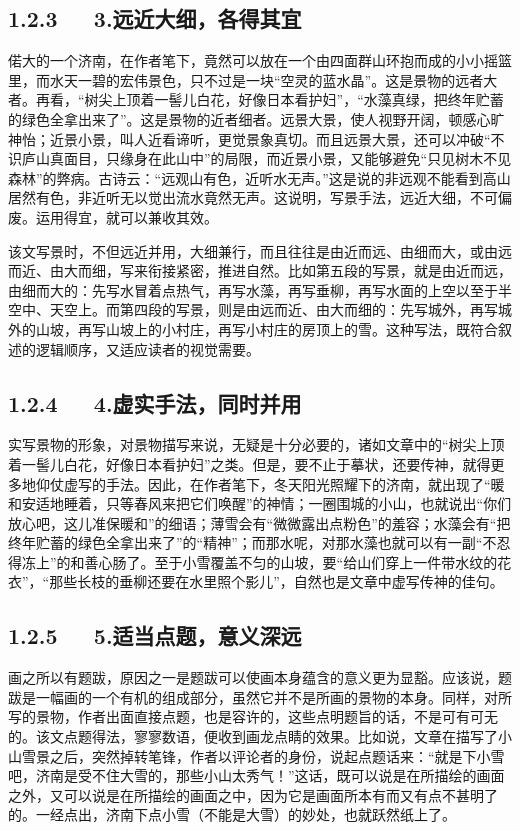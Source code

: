 \documentclass[letterpaper,10pt,english]{sphinxmanual}
\begin{document}
\subsection{1.2.3   3.远近大细，各得其宜}
\label{\detokenize{p01_u6563_u6587/_u8001_u820d-_u6d4e_u5357_u7684_u51ac_u5929:id7}}
偌大的一个济南，在作者笔下，竟然可以放在一个由四面群山环抱而成的小小摇篮里，而水天一碧的宏伟景色，只不过是一块“空灵的蓝水晶”。这是景物的远者大者。再看，“树尖上顶着一髻儿白花，好像日本看护妇”，“水藻真绿，把终年贮蓄的绿色全拿出来了”。这是景物的近者细者。远景大景，使人视野开阔，顿感心旷神怡；近景小景，叫人近看谛听，更觉景象真切。而且远景大景，还可以冲破“不识庐山真面目，只缘身在此山中”的局限，而近景小景，又能够避免“只见树木不见森林”的弊病。古诗云：“远观山有色，近听水无声。”这是说的非远观不能看到高山居然有色，非近听无以觉出流水竟然无声。这说明，写景手法，远近大细，不可偏废。运用得宜，就可以兼收其效。

该文写景时，不但远近并用，大细兼行，而且往往是由近而远、由细而大，或由远而近、由大而细，写来衔接紧密，推进自然。比如第五段的写景，就是由近而远，由细而大的：先写水冒着点热气，再写水藻，再写垂柳，再写水面的上空以至于半空中、天空上。而第四段的写景，则是由远而近、由大而细的：先写城外，再写城外的山坡，再写山坡上的小村庄，再写小村庄的房顶上的雪。这种写法，既符合叙述的逻辑顺序，又适应读者的视觉需要。


\subsection{1.2.4   4.虚实手法，同时并用}
\label{\detokenize{p01_u6563_u6587/_u8001_u820d-_u6d4e_u5357_u7684_u51ac_u5929:id8}}
实写景物的形象，对景物描写来说，无疑是十分必要的，诸如文章中的“树尖上顶着一髻儿白花，好像日本看护妇”之类。但是，要不止于摹状，还要传神，就得更多地仰仗虚写的手法。因此，在作者笔下，冬天阳光照耀下的济南，就出现了“暖和安适地睡着，只等春风来把它们唤醒”的神情；一圈围城的小山，也就说出“你们放心吧，这儿准保暖和”的细语；薄雪会有“微微露出点粉色”的羞容；水藻会有“把终年贮蓄的绿色全拿出来了”的“精神”；而那水呢，对那水藻也就可以有一副“不忍得冻上”的和善心肠了。至于小雪覆盖不匀的山坡，要“给山们穿上一件带水纹的花衣”，“那些长枝的垂柳还要在水里照个影儿”，自然也是文章中虚写传神的佳句。


\subsection{1.2.5   5.适当点题，意义深远}
\label{\detokenize{p01_u6563_u6587/_u8001_u820d-_u6d4e_u5357_u7684_u51ac_u5929:id9}}
画之所以有题跋，原因之一是题跋可以使画本身蕴含的意义更为显豁。应该说，题跋是一幅画的一个有机的组成部分，虽然它并不是所画的景物的本身。同样，对所写的景物，作者出面直接点题，也是容许的，这些点明题旨的话，不是可有可无的。该文点题得法，寥寥数语，便收到画龙点睛的效果。比如说，文章在描写了小山雪景之后，突然掉转笔锋，作者以评论者的身份，说起点题话来：“就是下小雪吧，济南是受不住大雪的，那些小山太秀气！”这话，既可以说是在所描绘的画面之外，又可以说是在所描绘的画面之中，因为它是画面所本有而又有点不甚明了的。一经点出，济南下点小雪（不能是大雪）的妙处，也就跃然纸上了。
\end{document}
